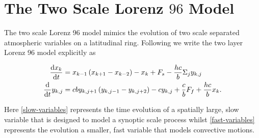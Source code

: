 \section{The Two Scale Lorenz $96$ Model} \label{section: L96-Model}

The two scale Lorenz 96 model mimics the evolution of two scale separated atmospheric variables on a latitudinal ring. Following \cite{Carlu2019} we write the two layer Lorenz 96 model explicitly as

\begin{align}
\dv{x_k}{t} &= x_{k-1} \left(x_{k+1} - x_{k-2} \right) -x_k + F_s - \frac{hc}{b} \Sigma_{j} y_{k, j} \label{slow-variables}\\
\dv{}{t} y_{k,j} &= cb y_{k, j+1} \left(y_{k, j-1} - y_{k, j + 2} \right) - c y_{k, j} + \frac{c}{b} F_f + \frac{hc}{b} x_k. \label{fast-variables}
\end{align}

Here \ref{slow-variables} represents the time evolution of a spatially large, slow variable that is designed to model a synoptic scale process whilst \ref{fast-variables} represents the evolution a smaller, fast variable that models convective motions.\\

